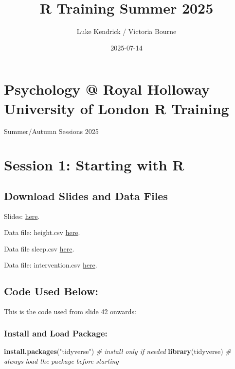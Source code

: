 \documentclass[
]{book}
\title{R Training Summer 2025}
\author{Luke Kendrick / Victoria Bourne}
\date{2025-07-14}
\newenvironment{Shaded}{\begin{snugshade}}{\end{snugshade}}
\newcommand{\CommentTok}[1]{\textcolor[rgb]{0.56,0.35,0.01}{\textit{#1}}}
\newcommand{\FunctionTok}[1]{\textcolor[rgb]{0.13,0.29,0.53}{\textbf{#1}}}
\newcommand{\NormalTok}[1]{#1}
\newcommand{\StringTok}[1]{\textcolor[rgb]{0.31,0.60,0.02}{#1}}
\begin{document}
\maketitle

{
\setcounter{tocdepth}{1}
\tableofcontents
}
\chapter*{Psychology @ Royal Holloway University of London R Training}\label{psychology-royal-holloway-university-of-london-r-training}

Summer/Autumn Sessions 2025

\chapter{Session 1: Starting with R}\label{session-1-starting-with-r}

\section{Download Slides and Data Files}\label{download-slides-and-data-files}

Slides: \href{downloads/startr.pdf}{here}.

Data file: height.csv \href{downloads/height.csv}{here}.

Data file sleep.csv \href{downloads/sleep.csv}{here}.

Data file: intervention.csv \href{downloads/intervention.csv}{here}.

\section{Code Used Below:}\label{code-used-below}

This is the code used from slide 42 onwards:

\subsection{Install and Load Package:}\label{install-and-load-package}

\begin{Shaded}
\begin{Highlighting}[]
\FunctionTok{install.packages}\NormalTok{(}\StringTok{"tidyverse"}\NormalTok{) }\CommentTok{\# install only if needed}
\FunctionTok{library}\NormalTok{(tidyverse) }\CommentTok{\# always load the package before starting}
\end{Highlighting}
\end{Shaded}
\end{document}
